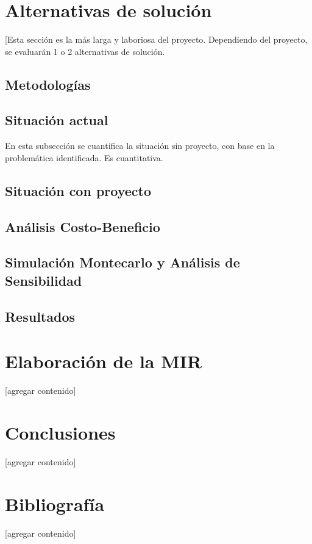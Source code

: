 \documentclass{article}
\begin{document}
\newpage

\section{Alternativas de solución}\label{sec:alternatives}
[Esta sección es la más larga y
laboriosa del proyecto. Dependiendo
del proyecto, se evaluarán 1 o 2
alternativas de solución. 
% 

\subsection{Metodologías}

\subsection{Situación actual}
En esta subsección se cuantifica la
situación sin proyecto, con base en la
problemática identificada. Es
cuantitativa.
\subsection{Situación con proyecto}

\subsection{Análisis Costo-Beneficio}
% 
% 

\subsection{Simulación Montecarlo y Análisis de Sensibilidad}

\subsection{Resultados}
% 
% 

\newpage
\section{Elaboración de la MIR}\label{sec:mir}
[agregar contenido]

\newpage
\section{Conclusiones}\label{sec:conclutions}
[agregar contenido]

\newpage
\section{Bibliografía}\label{sec:references}
[agregar contenido]
\end{document}
